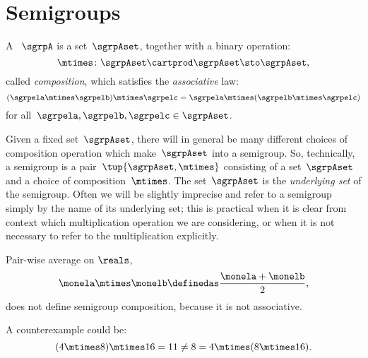 

\section{Semigroups}
\label{sec:semigroups}

\begin{ctdefinition}[Semigroup]
    \label{def:semigroup}
    A \emph{}~$\sgrpA$ is a set~$\sgrpAset$, together with a binary operation:
    \begin{equation}
        \mtimes  \colon \sgrpAset \cartprod \sgrpAset \sto \sgrpAset,
    \end{equation}
    called \emph{composition}, which satisfies the \emph{associative} law:
    \begin{equation}
        \label{eq:semigroup-associative}
        (\sgrpela \mtimes   \sgrpelb)\mtimes   \sgrpelc
        = \sgrpela \mtimes   (\sgrpelb \mtimes  \sgrpelc)
    \end{equation}
    for all~$\sgrpela , \sgrpelb, \sgrpelc \in \sgrpAset$.
\end{ctdefinition}



\begin{remark}
    Given a fixed set~$\sgrpAset$, there will in general be many different choices of composition operation which make~$\sgrpAset$ into a semigroup.
    So, technically, a semigroup is a pair~$\tup{\sgrpAset, \mtimes}$ consisting of a set~$\sgrpAset$ and a choice of composition~$\mtimes$.
    The set~$\sgrpAset$ is the \emph{underlying set} of the semigroup.
    Often we will be slightly imprecise and refer to a semigroup simply by the name of its underlying set;
    this is practical when it is clear from context which multiplication operation we are considering, or when it is not necessary to refer to the multiplication explicitly.
\end{remark}



\begin{example}
    Pair-wise average on $\reals$,
    \begin{equation}
        \label{eq:pairwise}
        \monela \mtimes \monelb \definedas  \frac{\monela + \monelb}{2},
    \end{equation}
    does not define semigroup composition, because it is not associative.

    A counterexample could be:
    \begin{equation}
        \label{eq:pairwise-counterexample}
        (4 \mtimes 8) \mtimes 16 = 11 \neq  8 = 4 \mtimes (8 \mtimes 16).
    \end{equation}
\end{example}



